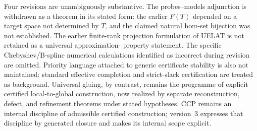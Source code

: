 \documentclass[11pt]{article}
\theoremstyle{definition}
\begin{document}
Four revisions are unambiguously substantive.  The probes--models adjunction is withdrawn
as a theorem in its stated form: the earlier $F(T)$ depended on a target space not determined
by $T$, and the claimed natural hom-set bijection was not established.  The earlier
finite-rank projection formulation of UELAT is not retained as a universal approximation-
property statement.  The specific Chebyshev/B-spline numerical calculations identified as
incorrect during revision are omitted.  Priority language attached to generic certificate
stability is also not maintained; standard effective completion and strict-slack
certification are treated as background.  Universal gluing, by contrast, remains the
programme of explicit certified local-to-global construction, now realized by separate
reconstruction, defect, and refinement theorems under stated hypotheses.  CCP remains an internal discipline of admissible certified construction; version~3
expresses that discipline by generated closure and makes its internal scope explicit.
\end{document}
